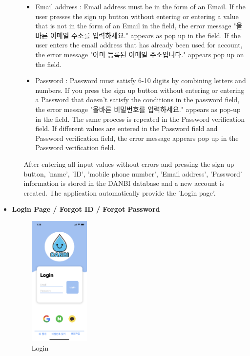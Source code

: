 \documentclass[conference]{IEEEtran}
\begin{document}
\begin{itemize}
\begin{enumerate}
\begin{itemize}
\item Email address : Email address must be in the form of an Email. If the user presses the sign up button without entering or entering a value that is not in the form of an Email in the field, the error message "올바른 이메일 주소를 입력하세요." appears as pop up in the field. If the user enters the email address that has already been used for account, the error message "이미 등록된 이메일 주소입니다." appears pop up on the field.
\item Password : Password must satisfy 6-10 digits by combining letters and numbers. If you press the sign up button without entering or entering a Password that doesn't satisfy the conditions in the password field, the error message "올바른 비밀번호를 입력하세요." appears as pop-up in the field. The same process is repeated in the Password verification field. If different values are entered in the Password field and Password verification field, the error message appears pop up in the Password verification field.
\end{itemize}
After entering all input values without errors and pressing the sign up button, 'name', 'ID', 'mobile phone number', 'Email address', 'Password' information is stored in the DANBI database and a new account is created. The application automatically provide the 'Login page'.
\end{enumerate}

\item \textbf{Login Page / Forgot ID / Forgot Password}

\par \begin{figure}[h!]
\includegraphics[width=3cm]{page/login.png}
\centering
\caption{Login}
\label{fig:login}
\end{figure}


\end{itemize}
\end{document}
